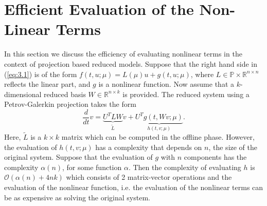 \section{Efficient Evaluation of the Non-Linear Terms} \label{sec:3.5}
In this section we discuss the efficiency of evaluating nonlinear terms in the context of projection based reduced models. Suppose that the right hand side in (\ref{eq:3.1}) is of the form $f(t, u ; \mu) = L(\mu) u + g(t,u ; \mu)$, where $L\in \mathbb P \times \mathbb R^{n\times n}$ reflects the linear part, and $g$ is a nonlinear function. Now assume that a $k$-dimensional reduced basis $W \in \mathbb R^{n\times k}$ is provided. The reduced system using a Petrov-Galerkin projection takes the form
\begin{equation} \label{eq:3.29}
	\frac{d}{dt} v= \underbrace{ U^T L W}_{\tilde L} v + \underbrace{ U^T g(t,Wv;\mu)}_{ h (t,v;\mu)}.
\end{equation}
Here, $\tilde L$ is a $k\times k$ matrix which can be computed in the offline phase. However, the evaluation of $ h (t,v;\mu)$ has a complexity that depends on $n$, the size of the original system. Suppose that the evaluation of $g$ with $n$ components has the complexity $\alpha(n)$, for some function $\alpha$. Then the complexity of evaluating $h$ is $\mathcal{O}(\alpha(n) + 4nk)$ which consists of 2 matrix-vector operations and the evaluation of the nonlinear function, i.e. the evaluation of the nonlinear terms can be as expensive as solving the original system.

